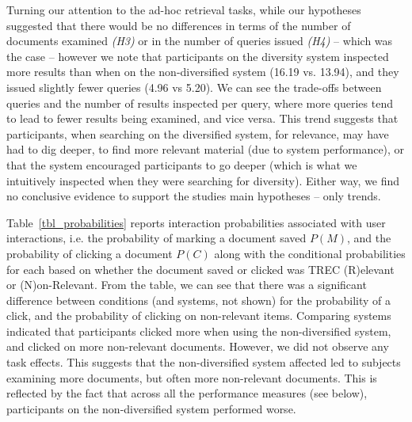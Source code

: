 

Turning our attention to the ad-hoc retrieval tasks, while our hypotheses suggested that there would be no differences in terms of the number of documents examined \emph{(H3)} or in the number of queries issued \emph{(H4)} -- which was the case -- however we note that participants on the diversity system inspected more results than when on the non-diversified system (16.19 vs. 13.94), and they issued slightly fewer queries (4.96 vs 5.20). We can see the trade-offs between queries and the number of results inspected per query, where more queries tend to lead to fewer results being examined, and vice versa. This trend suggests that participants, when searching on the diversified system, for relevance, may have had to dig deeper, to find more relevant material (due to system performance), or that the system encouraged participants to go deeper (which is what we intuitively inspected when they were searching for diversity). Either way, we find no conclusive evidence to support the studies main hypotheses -- only trends. 

Table~\ref{tbl_probabilities} reports interaction probabilities associated with user interactions, i.e. the probability of marking a document saved $P(M)$, and the probability of clicking a document $P(C)$ along with the conditional probabilities for each based on whether the document saved or clicked was TREC (R)elevant or (N)on-Relevant. From the table, we can see that there was a significant difference between conditions (and systems, not shown) for the probability of a click, and the probability of clicking on non-relevant items. Comparing systems indicated that participants clicked more when using the non-diversified system, and clicked on more non-relevant documents. However, we did not observe any task effects. This suggests that the non-diversified system affected led to subjects examining more documents, but often more non-relevant documents. This is reflected by the fact that across all the performance measures (see below), participants on the non-diversified system performed worse.

